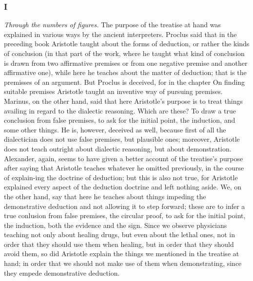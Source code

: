 \documentclass[a4paper]{book}
\begin{document}
\begin{pages}
\begin{Rightside}
\subsubsection{I}
\pend
\setcounter{pstartR}{1}
\numberpstarttrue
\pstart
\textit{Through the numbers of figures.} The purpose of the treatise at hand was explained in various ways by the ancient interpreters.
Proclus said that in the preceding book Aristotle taught about the forms of deduction, or rather the kinds of conclusion (in that part of the work, where he taught what kind of conclusion is drawn from two affirmative premises or from one negative premise and another affirmative one), while here he teaches about the matter of deduction; that is the premisses of an argument.
But Proclus is deceived, for in the chapter On finding suitable premises Aristotle taught an inventive way of pursuing premises.
Marinus, on the other hand, said that here Aristotle's purpose is to treat things availing in regard to the dialectic reasoning.
Which are these?
To draw a true conclusion from false premises, to ask for the initial point, the induction, and some other things.
He is, however, deceived as well, because first of all the dialectician does not use false premises, but plausible ones; moreover, Aristotle does not teach outright about dialectic reasoning, but about demonstration.
Alexander, again, seems to have given a better account of the treatise's purpose after saying that Aristotle teaches whatever he omitted previously, in the course of explain-ing the doctrine of deduction; but this is also not true, for Aristotle explained every aspect of the deduction doctrine and left nothing aside.
We, on the other hand, say that here he teaches about things impeding the demonstrative deduction and not allowing it to step forward; these are to infer a true conlusion from false premises, the circular proof, to ask for the initial point, the induction, both the evidence and the sign.
Since we observe physicians teaching not only about healing drugs, but even about the lethal ones, not in order that they should use them when healing, but in order that they should avoid them, so did Aristotle explain the things we mentioned in the treatise at hand; in order that we should not make use of them when demonstrating, since they empede demonstrative deduction.
\pend
\endnumbering
\end{Rightside}
\end{pages}
\Pages
\end{document}
